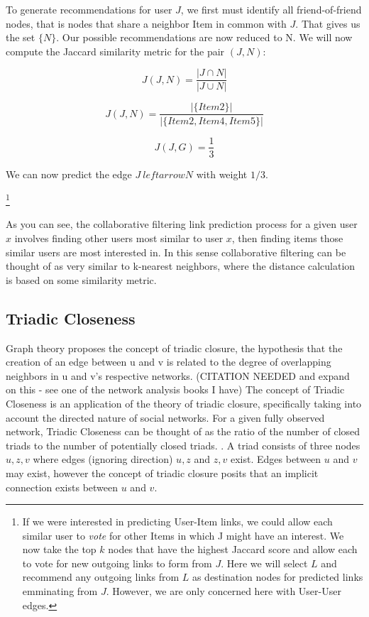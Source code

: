 To generate recommendations for user $J$, we first must identify all friend-of-friend nodes, that is nodes that share a neighbor Item in common with $J$. That gives us the set $\{N\}$. Our possible recommendations are now reduced to N. We will now compute the Jaccard similarity metric for the pair $(J, N)$:

\begin{equation}
\label{jaccard}
J(J,N) = \frac{|J \cap N|}{|J \cup N|}
\end{equation}

\begin{equation}
\label{jaccard}
J(J,N) = \frac{|\{Item2\}|}{|\{Item2, Item4, Item5\}|}
\end{equation}

\begin{equation}
\label{jaccard}
J(J,G) = \frac{1}{3}
\end{equation}

We can now predict the edge $J\ leftarrow N$ with weight $1/3$. 

\footnote{If we were interested in predicting User-Item links, we could allow each similar user to \textit{vote} for other Items in which J might have an interest. We now take the top $k$ nodes that have the highest Jaccard score and allow each to vote for new outgoing links to form from $J$. Here we will select $L$ and recommend any outgoing links from $L$ as destination nodes for predicted links emminating from $J$. However, we are only concerned here with User-User edges.}

As you can see, the collaborative filtering link prediction process for a given user $x$ involves finding other users most similar to user $x$, then finding items those similar users are most interested in. In this sense collaborative filtering can be thought of as very similar to k-nearest neighbors, where the distance calculation is based on some similarity metric.

\subsection{Triadic Closeness}
Graph theory proposes the concept of triadic closure, the hypothesis that the creation of an edge between u and v is related to the degree of overlapping neighbors in u and v's respective networks. (CITATION NEEDED and expand on this - see one of the network analysis books I have) The concept of Triadic Closeness is an application of the theory of triadic closure, specifically taking into account the directed nature of social networks. For a given fully observed network, Triadic Closeness can be thought of as the ratio of the number of closed triads to the number of potentially closed triads. \cite{Schall2014}. A triad consists of three nodes $u, z, v$ where edges (ignoring direction) $u,z$ and $z,v$ exist. Edges between $u$ and $v$ may exist, however the concept of triadic closure posits that an implicit connection exists between $u$ and $v$.

